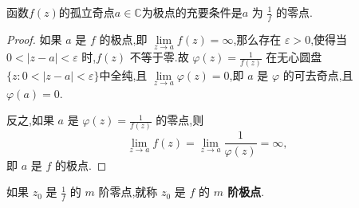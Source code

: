 \documentclass[../../main.tex]{subfiles}%
\begin{document}
\begin{theorem}\label{theorem:复变函数----定理5.2.2}
函数$f(z)$的孤立奇点$a\in \mathbb{C}$为极点的充要条件是\( a\) 为 \( \frac{1}{f} \) 的零点.
\end{theorem}
\begin{proof}

如果 \( a \) 是 \( f \) 的极点,即 \( \lim\limits_{z \to a} f(z) = \infty \),那么存在 \( \varepsilon > 0 \),使得当 \( 0 < |z - a| < \varepsilon \) 时,\( f(z) \) 不等于零.故 \( \varphi(z) = \frac{1}{f(z)} \) 在无心圆盘$\{z:0<|z-a|<\varepsilon\}$中全纯,且 \( \lim\limits_{z \to a} \varphi(z) = 0 \),即 \( a \) 是 \( \varphi \) 的可去奇点,且 \( \varphi(a) = 0 \).

反之,如果 \( a \) 是 \( \varphi(z) = \frac{1}{f(z)} \) 的零点,则
\[
\lim\limits_{z \to a} f(z) = \lim\limits_{z \to a} \frac{1}{\varphi(z)} = \infty,
\]
即 \( a \) 是 \( f \) 的极点.

\end{proof}
 
\begin{definition}
如果 \( z_0 \) 是 \( \frac{1}{f} \) 的 \( m \) 阶零点,就称 \( z_0 \) 是 \( f \) 的 \textbf{\( m \) 阶极点}.
\end{definition}
\end{document}
